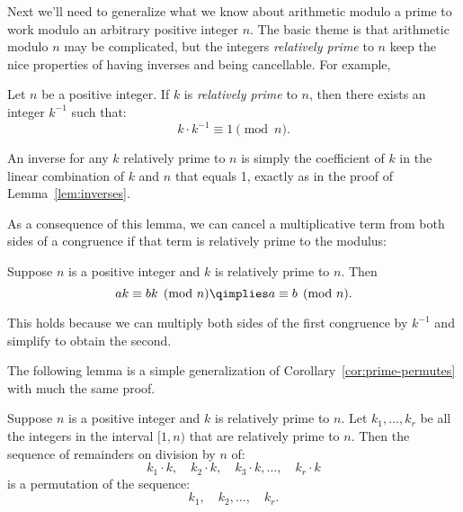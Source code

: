 Next we'll need to generalize what we know about arithmetic modulo a prime to work modulo
an arbitrary positive integer $n$.  The basic theme is that arithmetic modulo $n$ may be
complicated, but the integers \emph{relatively prime} to $n$ keep the nice properties of
having inverses and being cancellable.  For example,
\begin{lemma}
\label{lem:inverse-arb}
Let $n$ be a positive integer.  If $k$ is \emph{relatively prime} to $n$, then there exists
an integer $k^{-1}$ such that:
\[
k \cdot k^{-1} \equiv 1 \pmod{n}.
\]
\end{lemma}
An inverse for any $k$ relatively prime to $n$ is simply the coefficient of $k$ in the
linear combination of $k$ and $n$ that equals 1, exactly as in the proof of
Lemma~\ref{lem:inverses}.

\iffalse
\begin{proof}
There exist integers $s$ and $t$ such that $s k + t n = \gcd(k, n) = 1$ by
Theorem~\ref{th:gcd}.  Rearranging terms gives $tn = 1 - sk$, which implies that $n
\divides 1 - sk$ and $sk \equiv 1 \pmod{n}$.  Define $k^{-1}$ to be $s$.
\end{proof}
\fi

As a consequence of this lemma, we can cancel a multiplicative term from both sides of a
congruence if that term is relatively prime to the modulus:
\begin{corollary}
\label{cor:cancellation-arb}
Suppose $n$ is a positive integer and $k$ is relatively prime to $n$.  Then
\[
a k \equiv b k \pmod{n} \qimplies a \equiv b \pmod{n}.
\]
\end{corollary}

This holds because we can multiply both sides of the first congruence by $k^{-1}$ and
simplify to obtain the second.

The following lemma is a simple generalization of Corollary~\ref{cor:prime-permutes} with
much the same proof.
\begin{lemma}
\label{lem:permutes-arb}
Suppose $n$ is a positive integer and $k$ is relatively prime to $n$.  Let $k_1, \dots,
k_r$ be all the integers in the interval $[1,n)$ that are relatively prime to $n$.  Then
  the sequence of remainders on division by $n$ of:
\[
k_1 \cdot k,\quad k_2 \cdot k,\quad k_3 \cdot k, \dots,\quad k_r \cdot k
\]
is a permutation of the sequence:
\[
k_1,\quad k_2, \dots,\quad k_r.
\]
\end{lemma}

